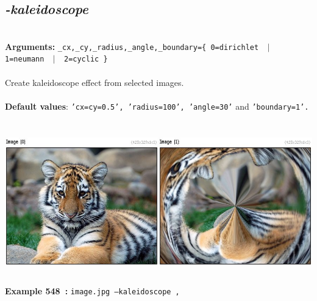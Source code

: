 \documentclass[a4paper,11pt,twoside]{book}
\begin{document}
\subsection{\emph{-kaleidoscope} }\vspace*{-0.5em}
~\\\textbf{Arguments: } 
{\small \texttt{\_cx,\_cy,\_radius,\_angle,\_boundary=\{ 0=dirichlet ~$|$~ 1=neumann ~$|$~ 2=cyclic \}}}\\~\\
Create kaleidoscope effect from selected images.
~\\~\\\textbf{Default values}: {\small \texttt{'cx=cy=0.5', 'radius=100', 'angle=30'} and \texttt{'boundary=1'.}}
\begin{center}\includegraphics[keepaspectratio=true,height=7cm,width=\textwidth]{img/gmic_def548.jpg}\\
{\footnotesize \textbf{Example 548~:} \texttt{image.jpg --kaleidoscope ,}}
\end{center}
\end{document}
